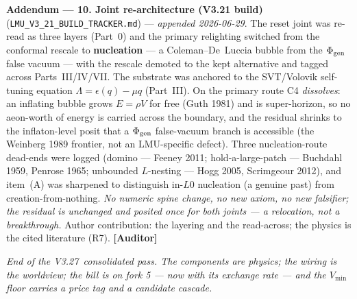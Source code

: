 \documentclass[11pt]{article}
\newcommand{\lmuver}{3.27}
\newcommand{\Auditor}{\textbf{\textcolor{teal!55!black}{[Auditor]}}}
\begin{document}
\smallskip\noindent\textbf{Addendum --- 10. Joint re-architecture (V3.21 build)} (\texttt{LMU\_V3\_21\_BUILD\_TRACKER.md}) --- \emph{appended 2026-06-29}. The reset joint was re-read as three layers (Part~0) and the primary relighting switched from the conformal rescale to \textbf{nucleation} --- a Coleman--De~Luccia bubble from the $\Phi_{\rm gen}$ false vacuum --- with the rescale demoted to the kept alternative and tagged across Parts~III/IV/VII. The substrate was anchored to the SVT/Volovik self-tuning equation $\Lambda=\epsilon(q)-\mu q$ (Part~III). On the primary route C4 \emph{dissolves}: an inflating bubble grows $E=\rho V$ for free (Guth 1981) and is super-horizon, so no aeon-worth of energy is carried across the boundary, and the residual shrinks to the inflaton-level posit that a $\Phi_{\rm gen}$ false-vacuum branch is accessible (the Weinberg 1989 frontier, not an LMU-specific defect). Three nucleation-route dead-ends were logged (domino --- Feeney 2011; hold-a-large-patch --- Buchdahl 1959, Penrose 1965; unbounded $L$-nesting --- Hogg 2005, Scrimgeour 2012), and item~(A) was sharpened to distinguish in-$L0$ nucleation (a genuine past) from creation-from-nothing. \emph{No numeric spine change, no new axiom, no new falsifier; the residual is unchanged and posited once for both joints --- a relocation, not a breakthrough.} Author contribution: the layering and the read-across; the physics is the cited literature (R7). \Auditor

\vspace{6pt}\centering\small\textit{End of the V\lmuver\ consolidated pass. The components are physics; the wiring is the worldview; the bill is on fork 5 --- now with its exchange rate --- and the $V_{\min}$ floor carries a price tag and a candidate cascade.}
\end{document}
